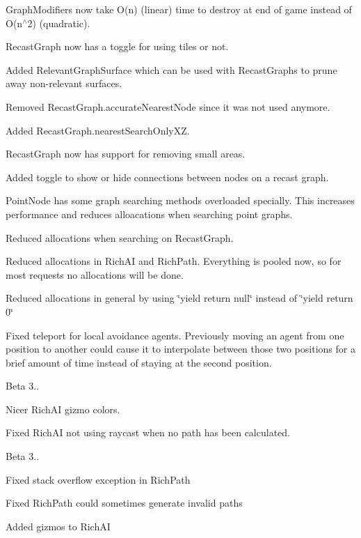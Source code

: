 \begin{DoxyItemize}
\begin{DoxyItemize}
\item Graph\+Modifiers now take O(n) (linear) time to destroy at end of game instead of O(n$^\wedge$2) (quadratic).
\item Recast\+Graph now has a toggle for using tiles or not.
\item Added Relevant\+Graph\+Surface which can be used with Recast\+Graphs to prune away non-\/relevant surfaces.
\item Removed Recast\+Graph.\+accurate\+Nearest\+Node since it was not used anymore.
\item Added Recast\+Graph.\+nearest\+Search\+Only\+XZ.
\item Recast\+Graph now has support for removing small areas.
\item Added toggle to show or hide connections between nodes on a recast graph.
\item Point\+Node has some graph searching methods overloaded specially. This increases performance and reduces alloacations when searching point graphs.
\item Reduced allocations when searching on Recast\+Graph.
\item Reduced allocations in Rich\+AI and Rich\+Path. Everything is pooled now, so for most requests no allocations will be done.
\item Reduced allocations in general by using \char`\"{}yield return null\char`\"{} instead of \char`\"{}yield return 0\char`\"{}
\item Fixed teleport for local avoidance agents. Previously moving an agent from one position to another could cause it to interpolate between those two positions for a brief amount of time instead of staying at the second position.
\end{DoxyItemize}
\item Beta 3..
\begin{DoxyItemize}
\item Nicer Rich\+AI gizmo colors.
\item Fixed Rich\+AI not using raycast when no path has been calculated.
\end{DoxyItemize}
\item Beta 3..
\begin{DoxyItemize}
\item Fixed stack overflow exception in Rich\+Path
\item Fixed Rich\+Path could sometimes generate invalid paths
\item Added gizmos to Rich\+AI
\end{DoxyItemize}

\end{DoxyItemize}
